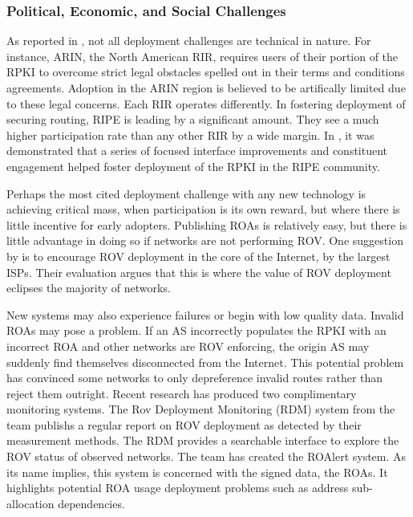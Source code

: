 \documentclass[sigconf]{acmart}
\begin{document}
\subsubsection{Political, Economic, and Social Challenges}

As reported in \cite{yoo_lowering_2018}, not all deployment challenges
are technical in nature.  For instance, ARIN, the North American RIR,
requires users of their portion of the RPKI to overcome strict legal
obstacles spelled out in their terms and conditions agreements.
Adoption in the ARIN region is believed to be artifically limited due to
these legal concerns.  Each RIR operates differently.  In fostering
deployment of securing routing, RIPE is leading by a significant amount.
They see a much higher participation rate than any other RIR by a wide
margin.  In \cite{alex_band_ripe_2015}, it was demonstrated that a
series of focused interface improvements and constituent engagement
helped foster deployment of the RPKI in the RIPE community.

Perhaps the most cited deployment challenge with any new technology is
achieving critical mass, when participation is its own reward, but where
there is little incentive for early adopters.  Publishing ROAs is
relatively easy, but there is little advantage in doing so if networks
are not performing ROV.  One suggestion by \cite{gilad_are_2017} is to
encourage ROV deployment in the core of the Internet, by the largest
ISPs.  Their evaluation argues that this is where the value of ROV
deployment eclipses the majority of networks.

New systems may also experience failures or begin with low quality data.
Invalid ROAs may pose a problem.  If an AS incorrectly populates the
RPKI with an incorrect ROA and other networks are ROV enforcing, the
origin AS may suddenly find themselves disconnected from the Internet.
This potential problem has convinced some networks to only depreference
invalid routes rather than reject them outright.  Recent research
has produced two complimentary monitoring systems.  The Rov Deployment
Monitoring (RDM) system from the \cite{reuter_towards_2018} team publishs a
regular report on ROV deployment as detected by their measurement
methods.  The RDM provides a searchable interface to explore the ROV
status of observed networks.  The \cite{gilad_are_2017} team has created
the ROAlert system.  As its name implies, this system is concerned with
the signed data, the ROAs.  It highlights potential ROA usage
deployment problems such as address sub-allocation dependencies.
\end{document}
